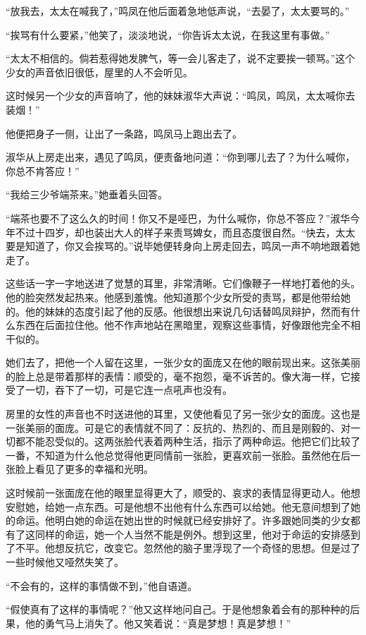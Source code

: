 \par “放我去，太太在喊我了，”鸣凤在他后面着急地低声说，“去晏了，太太要骂的。”
\par “挨骂有什么要紧，”他笑了，淡淡地说，“你告诉太太说，在我这里有事做。”
\par “太太不相信的。倘若惹得她发脾气，等一会儿客走了，说不定要挨一顿骂。”这个少女的声音依旧很低，屋里的人不会听见。
\par 这时候另一个少女的声音响了，他的妹妹淑华大声说：“鸣凤，鸣凤，太太喊你去装烟！”
\par 他便把身子一侧，让出了一条路，鸣凤马上跑出去了。
\par 淑华从上房走出来，遇见了鸣凤，便责备地问道：“你到哪儿去了？为什么喊你，你总不肯答应！”
\par “我给三少爷端茶来。”她垂着头回答。
\par “端茶也要不了这么久的时间！你又不是哑巴，为什么喊你，你总不答应？”淑华今年不过十四岁，却也装出大人的样子来责骂婢女，而且态度很自然。“快去，太太要是知道了，你又会挨骂的。”说毕她便转身向上房走回去，鸣凤一声不响地跟着她走了。
\par 这些话一字一字地送进了觉慧的耳里，非常清晰。它们像鞭子一样地打着他的头。他的脸突然发起热来。他感到羞愧。他知道那个少女所受的责骂，都是他带给她的。他的妹妹的态度引起了他的反感。他很想出来说几句话替鸣凤辩护，然而有什么东西在后面拉住他。他不作声地站在黑暗里，观察这些事情，好像跟他完全不相干似的。
\par 她们去了，把他一个人留在这里，一张少女的面庞又在他的眼前现出来。这张美丽的脸上总是带着那样的表情：顺受的，毫不抱怨，毫不诉苦的。像大海一样，它接受了一切，吞下了一切，可是它连一点吼声也没有。
\par 房里的女性的声音也不时送进他的耳里，又使他看见了另一张少女的面庞。这也是一张美丽的面庞。可是它的表情就不同了：反抗的、热烈的、而且是刚毅的、对一切都不能忍受似的。这两张脸代表着两种生活，指示了两种命运。他把它们比较了一番，不知道为什么他总觉得他更同情前一张脸，更喜欢前一张脸。虽然他在后一张脸上看见了更多的幸福和光明。
\par 这时候前一张面庞在他的眼里显得更大了，顺受的、哀求的表情显得更动人。他想安慰她，给她一点东西。可是他想不出他有什么东西可以给她。他无意间想到了她的命运。他明白她的命运在她出世的时候就已经安排好了。许多跟她同类的少女都有了这同样的命运，她一个人当然不能是例外。想到这里，他对于命运的安排感到了不平。他想反抗它，改变它。忽然他的脑子里浮现了一个奇怪的思想。但是过了一些时候他又哑然失笑了。
\par “不会有的，这样的事情做不到，”他自语道。
\par “假使真有了这样的事情呢？”他又这样地问自己。于是他想象着会有的那种种的后果，他的勇气马上消失了。他又笑着说：“真是梦想！真是梦想！”
